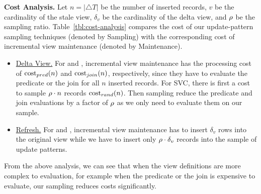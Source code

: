 {\noindent \bf Cost Analysis.} Let $n = |\triangle T|$ be the number of inserted records, $v$ be the cardinality of the stale view, $\delta_v$ be the cardinality of the delta view, and $\rho $ be the sampling ratio. Table~\ref{tbl:cost-analysis} compares the cost of our update-pattern sampling techniques (denoted by Sampling) with the corresponding cost of incremental view maintenance (denoted by Maintenance).





\vspace{-.5em}

\begin{itemize} %
\item \underline{Delta View.} For \spview and \fjview, incremental view maintenance has the processing cost of $\textrm{cost}_{pred}(n)$ and $\textrm{cost}_{join}(n)$, respectively, since they have to evaluate the predicate or the join for all $n$ inserted records. For SVC, there is first a cost to sample $\rho  \cdot n$ records $\textrm{cost}_{rand}(n)$. Then sampling reduce the predicate and join evaluations by a factor of $\rho $ as we only need to evaluate them on our sample.  \vspace{-0.5em}
\item \underline{Refresh.} For \spview and \fjview, incremental view maintenance has to insert $\delta_v$ rows into the original view while we have to insert only $\rho  \cdot \delta_v$ records into the sample of update patterns. %
\end{itemize}
\vspace{-.5em}

From the above analysis, we can see that when the view definitions are more complex to evaluation, for example when the predicate or the join is expensive to evaluate, our sampling reduces costs significantly. 


